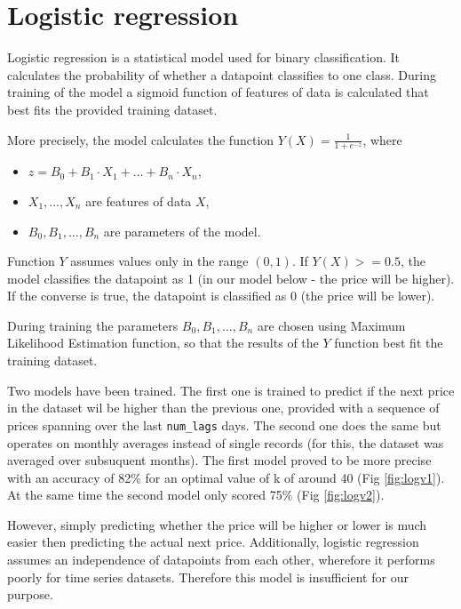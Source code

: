 \section{Logistic regression}

Logistic regression is a statistical model used for binary classification.
It calculates the probability of whether a datapoint classifies to one class.
During training of the model a sigmoid function of features of data is calculated that best fits the provided training dataset.

More precisely, the model calculates the function \(Y(X) = \frac{1}{1+e^{-z}}\), where
\begin{itemize}
	\item \(z = B_0 + B_1\cdot X_1 + \ldots + B_n\cdot X_n\),
	\item \(X_1, \ldots, X_n\) are features of data \(X\),
	\item \(B_0, B_1, \ldots, B_n\) are parameters of the model.
\end{itemize}
Function \(Y\) assumes values only in the range \((0,1)\).
If \(Y(X) >= 0.5\), the model classifies the datapoint as 1 (in our model below - the price will be higher). If the converse is true, the datapoint is classified as 0 (the price will be lower).

During training the parameters \(B_0, B_1, \ldots, B_n\) are chosen using Maximum Likelihood Estimation function, so that the results of the \(Y\) function best fit the training dataset.

Two models have been trained.
The first one is trained to predict if the next price in the dataset wil be higher than the previous one, provided with a sequence of prices spanning over the last \verb|num_lags| days.
The second one does the same but operates on monthly averages instead of single records (for this, the dataset was averaged over subsuquent months).
The first model proved to be more precise with an accuracy of 82\% for an optimal value of k of around 40 (Fig \ref{fig:logv1}). At the same time the second model only scored 75\% (Fig \ref{fig:logv2}).

However, simply predicting whether the price will be higher or lower is much easier then predicting the actual next price.
Additionally, logistic regression assumes an independence of datapoints from each other, wherefore it performs poorly for time series datasets.
Therefore this model is insufficient for our purpose.

